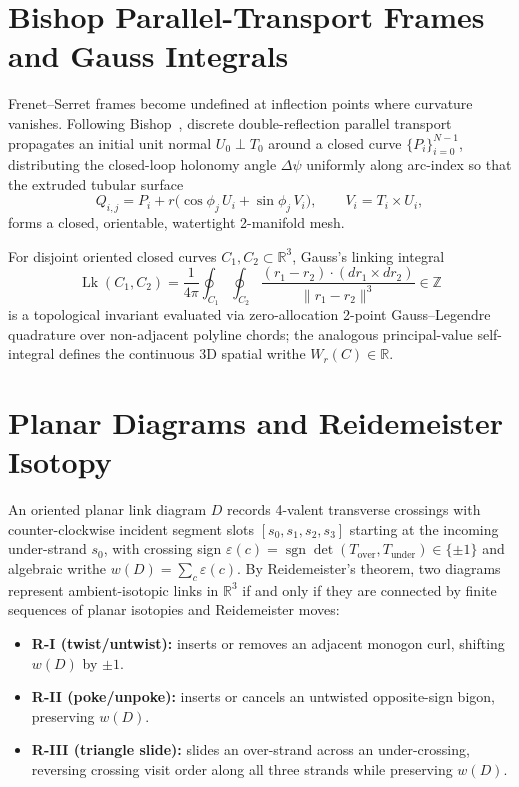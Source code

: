 \documentclass{article}
\begin{document}
\section{Bishop Parallel-Transport Frames and Gauss Integrals}

Frenet--Serret frames become undefined at inflection points where curvature vanishes. Following Bishop~\cite{bishop1975there}, discrete double-reflection parallel transport propagates an initial unit normal $U_0 \perp T_0$ around a closed curve $\{P_i\}_{i=0}^{N-1}$, distributing the closed-loop holonomy angle $\Delta\psi$ uniformly along arc-index so that the extruded tubular surface
\[
Q_{i,j} = P_i + r\bigl(\cos\phi_j\, U_i + \sin\phi_j\, V_i\bigr), \qquad V_i = T_i \times U_i,
\]
forms a closed, orientable, watertight 2-manifold mesh.

For disjoint oriented closed curves $C_1, C_2 \subset \mathbb{R}^3$, Gauss's linking integral
\[
\operatorname{Lk}(C_1, C_2) = \frac{1}{4\pi} \oint_{C_1} \oint_{C_2}
\frac{(r_1 - r_2) \cdot (dr_1 \times dr_2)}{\|r_1 - r_2\|^3} \in \mathbb{Z}
\]
is a topological invariant evaluated via zero-allocation 2-point Gauss--Legendre quadrature over non-adjacent polyline chords; the analogous principal-value self-integral defines the continuous 3D spatial writhe $W_r(C) \in \mathbb{R}$.

\section{Planar Diagrams and Reidemeister Isotopy}

An oriented planar link diagram $D$ records 4-valent transverse crossings with counter-clockwise incident segment slots $[s_0, s_1, s_2, s_3]$ starting at the incoming under-strand $s_0$, with crossing sign $\varepsilon(c) = \operatorname{sgn}\det(T_{\text{over}}, T_{\text{under}}) \in \{\pm 1\}$ and algebraic writhe $w(D) = \sum_c \varepsilon(c)$. By Reidemeister's theorem, two diagrams represent ambient-isotopic links in $\mathbb{R}^3$ if and only if they are connected by finite sequences of planar isotopies and Reidemeister moves:
\begin{itemize}
    \item \textbf{R-I (twist/untwist):} inserts or removes an adjacent monogon curl, shifting $w(D)$ by $\pm 1$.
    \item \textbf{R-II (poke/unpoke):} inserts or cancels an untwisted opposite-sign bigon, preserving $w(D)$.
    \item \textbf{R-III (triangle slide):} slides an over-strand across an under-crossing, reversing crossing visit order along all three strands while preserving $w(D)$.
\end{itemize}
\end{document}
